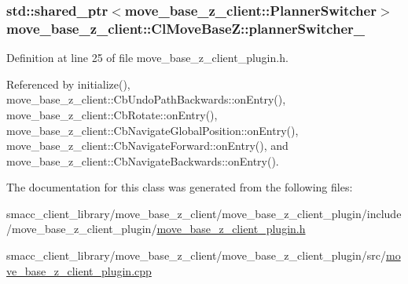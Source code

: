 \subsubsection[{\texorpdfstring{planner\+Switcher\+\_\+}{plannerSwitcher_}}]{\setlength{\rightskip}{0pt plus 5cm}std\+::shared\+\_\+ptr$<${\bf move\+\_\+base\+\_\+z\+\_\+client\+::\+Planner\+Switcher}$>$ move\+\_\+base\+\_\+z\+\_\+client\+::\+Cl\+Move\+Base\+Z\+::planner\+Switcher\+\_\+}\hypertarget{classmove__base__z__client_1_1ClMoveBaseZ_ac57d2293bc0a5c4fcef326379822cc5e}{}\label{classmove__base__z__client_1_1ClMoveBaseZ_ac57d2293bc0a5c4fcef326379822cc5e}


Definition at line 25 of file move\+\_\+base\+\_\+z\+\_\+client\+\_\+plugin.\+h.



Referenced by initialize(), move\+\_\+base\+\_\+z\+\_\+client\+::\+Cb\+Undo\+Path\+Backwards\+::on\+Entry(), move\+\_\+base\+\_\+z\+\_\+client\+::\+Cb\+Rotate\+::on\+Entry(), move\+\_\+base\+\_\+z\+\_\+client\+::\+Cb\+Navigate\+Global\+Position\+::on\+Entry(), move\+\_\+base\+\_\+z\+\_\+client\+::\+Cb\+Navigate\+Forward\+::on\+Entry(), and move\+\_\+base\+\_\+z\+\_\+client\+::\+Cb\+Navigate\+Backwards\+::on\+Entry().



The documentation for this class was generated from the following files\+:\begin{DoxyCompactItemize}
\item 
smacc\+\_\+client\+\_\+library/move\+\_\+base\+\_\+z\+\_\+client/move\+\_\+base\+\_\+z\+\_\+client\+\_\+plugin/include/move\+\_\+base\+\_\+z\+\_\+client\+\_\+plugin/\hyperlink{move__base__z__client__plugin_8h}{move\+\_\+base\+\_\+z\+\_\+client\+\_\+plugin.\+h}\item 
smacc\+\_\+client\+\_\+library/move\+\_\+base\+\_\+z\+\_\+client/move\+\_\+base\+\_\+z\+\_\+client\+\_\+plugin/src/\hyperlink{move__base__z__client__plugin_8cpp}{move\+\_\+base\+\_\+z\+\_\+client\+\_\+plugin.\+cpp}\end{DoxyCompactItemize}
